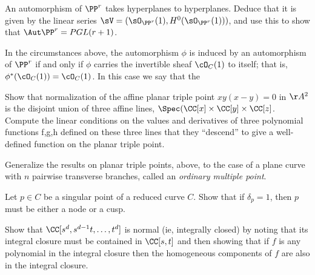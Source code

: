 \begin{exercise}
An automorphism of $\PP^r$ takes hyperplanes to hyperplanes. Deduce that it is given by the linear series
$\sV = (\sO_{\PP^r}(1), H^0(\sO_{\PP^r}(1)))$, and use this to show that $\Aut \PP^r = PGL(r+1)$. 
\end{exercise}

\begin{exercise}\label{projective automorphism}
In the circumstances above, the automorphism $\phi$ is induced by an automorphism of $\PP^r$ if and only if $\phi$ carries the invertible sheaf $\cO_{C}(1)$ to itself; that is, $\phi^*(\cO_{C}(1)) = \cO_{C}(1)$. In this case we say that the
\end{exercise}

\begin{exercise}
Show that normalization of the affine planar triple point $xy(x-y) = 0$ in $\AA^2$ is the disjoint union of three
affine lines, $\Spec(\CC[x] \times \CC[y]\times \CC[z]$. Compute the linear conditions on the values and derivatives of three polynomial functions f,g,h defined on
these three lines that they ``descend'' to give a well-defined function on the planar triple point.
\end{exercise}

\begin{exercise} Generalize the results on planar triple points, above, to the case of a plane curve with $n$ pairwise
transverse branches, called an \emph{ordinary multiple point}.
\end{exercise}

\begin{exercise}
Let $p \in C$ be a singular point of a reduced curve $C$. Show that if $\delta_p = 1$, then $p$ must be either a node or a cusp.
\end{exercise}

\begin{exercise}\label{normality of RNC}
 Show that $\CC[s^d,s^{d-1}t,\dots, t^d]$ is normal (ie, integrally closed) by noting that its integral closure must be
 contained in $\CC[s,t]$ and then showing that if $f$ is any polynomial
 in the integral closure then the homogeneous components of $f$ are also in the integral closure.
\end{exercise}


